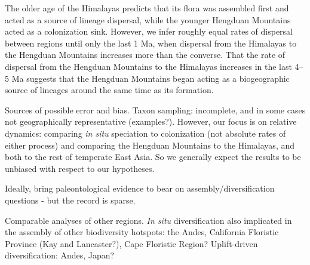 The older age of the Himalayas predicts that its flora was assembled first and acted as a source of lineage dispersal, while the younger Hengduan Mountains acted as a colonization sink. However, we infer roughly equal rates of dispersal between regions until only the last 1 Ma, when dispersal from the Himalayas to the Hengduan Mountains increases more than the converse. That the rate of dispersal from the Hengduan Mountains to the Himalayas increases in the last 4--5 Ma suggests that the Hengduan Mountains began acting as a biogeographic source of lineages around the same time as its formation.

Sources of possible error and bias. Taxon sampling: incomplete, and in some cases not geographically representative (examples?). However, our focus is on relative dynamics: comparing \textit{in situ} speciation to colonization (not absolute rates of either process) and comparing the Hengduan Mountains to the Himalayas, and both to the rest of temperate East Asia. So we generally expect the results to be unbiased with respect to our hypotheses.

Ideally, bring paleontological evidence to bear on assembly/diversification questions - but the record is sparse.

Comparable analyses of other regions. \textit{In situ} diversification also implicated in the assembly of other biodiversity hotspots: the Andes, California Floristic Province (Kay and Lancaster?), Cape Floristic Region? Uplift-driven diversification: Andes, Japan?
